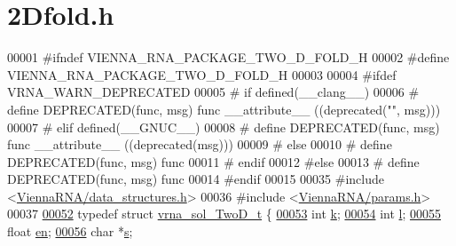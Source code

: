 \hypertarget{2Dfold_8h_source}{}\section{2\+Dfold.h}
\label{2Dfold_8h_source}

\begin{DoxyCode}
00001 \textcolor{preprocessor}{#ifndef VIENNA\_RNA\_PACKAGE\_TWO\_D\_FOLD\_H}
00002 \textcolor{preprocessor}{#define VIENNA\_RNA\_PACKAGE\_TWO\_D\_FOLD\_H}
00003 
00004 \textcolor{preprocessor}{#ifdef VRNA\_WARN\_DEPRECATED}
00005 \textcolor{preprocessor}{# if defined(\_\_clang\_\_)}
00006 \textcolor{preprocessor}{#  define DEPRECATED(func, msg) func \_\_attribute\_\_ ((deprecated("", msg)))}
00007 \textcolor{preprocessor}{# elif defined(\_\_GNUC\_\_)}
00008 \textcolor{preprocessor}{#  define DEPRECATED(func, msg) func \_\_attribute\_\_ ((deprecated(msg)))}
00009 \textcolor{preprocessor}{# else}
00010 \textcolor{preprocessor}{#  define DEPRECATED(func, msg) func}
00011 \textcolor{preprocessor}{# endif}
00012 \textcolor{preprocessor}{#else}
00013 \textcolor{preprocessor}{# define DEPRECATED(func, msg) func}
00014 \textcolor{preprocessor}{#endif}
00015 
00035 \textcolor{preprocessor}{#include <\hyperlink{data__structures_8h}{ViennaRNA/data\_structures.h}>}
00036 \textcolor{preprocessor}{#include <\hyperlink{params_8h}{ViennaRNA/params.h}>}
00037 
\hyperlink{group__kl__neighborhood__mfe}{00052} \textcolor{keyword}{typedef} \textcolor{keyword}{struct }\hyperlink{group__kl__neighborhood__mfe_structvrna__sol__TwoD__t}{vrna\_sol\_TwoD\_t} \{
\hyperlink{group__kl__neighborhood__mfe_ac111e850bb3b3a11b6b5707912cfa1b8}{00053}   \textcolor{keywordtype}{int}   \hyperlink{group__kl__neighborhood__mfe_ac111e850bb3b3a11b6b5707912cfa1b8}{k};        
\hyperlink{group__kl__neighborhood__mfe_ab8e95cd920901175a2cc8de726ab1d36}{00054}   \textcolor{keywordtype}{int}   \hyperlink{group__kl__neighborhood__mfe_ab8e95cd920901175a2cc8de726ab1d36}{l};        
\hyperlink{group__kl__neighborhood__mfe_a7577863a6a84224dfee39b321c03cab1}{00055}   \textcolor{keywordtype}{float} \hyperlink{group__kl__neighborhood__mfe_a7577863a6a84224dfee39b321c03cab1}{en};       
\hyperlink{group__kl__neighborhood__mfe_ac5942d2505a6cd7e4a8073a321d5d2d5}{00056}   \textcolor{keywordtype}{char}  *\hyperlink{group__kl__neighborhood__mfe_ac5942d2505a6cd7e4a8073a321d5d2d5}{s};       

\end{DoxyCode}
